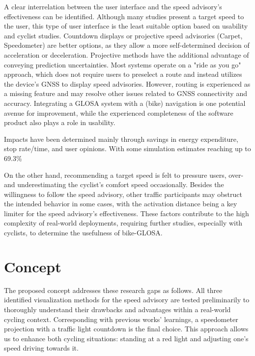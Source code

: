 \begin{Summary}
A clear interrelation between the user interface and the speed advisory's effectiveness can be identified. Although many studies present a target speed to the user, this type of user interface is the least suitable option based on usability and cyclist studies. Countdown displays or projective speed advisories (Carpet, Speedometer) are better options, as they allow a more self-determined decision of acceleration or deceleration. Projective methods have the additional advantage of conveying prediction uncertainties. Most systems operate on a "ride as you go" approach, which does not require users to preselect a route and instead utilizes the device's GNSS to display speed advisories. However, routing is experienced as a missing feature and may resolve other issues related to GNSS connectivity and accuracy. Integrating a GLOSA system with a (bike) navigation is one potential avenue for improvement, while the experienced completeness of the software product also plays a role in usability.

Impacts have been determined mainly through savings in energy expenditure, stop rate/time, and user opinions. With some simulation estimates reaching up to 69.3\% %

On the other hand, recommending a target speed is felt to pressure users, over- and underestimating the cyclist's comfort speed occasionally. Besides the willingness to follow the speed advisory, other traffic participants may obstruct the intended behavior in some cases, with the activation distance being a key limiter for the speed advisory's effectiveness. These factors contribute to the high complexity of real-world deployments, requiring further studies, especially with cyclists, to determine the usefulness of bike-GLOSA.
\end{Summary}

\section{Concept}

The proposed concept addresses these research gaps as follows. All three identified visualization methods for the speed advisory are tested preliminarily to thoroughly understand their drawbacks and advantages within a real-world cycling context. Corresponding with previous works' learnings, a speedometer projection with a traffic light countdown is the final choice. This approach allows us to enhance both cycling situations: standing at a red light and adjusting one's speed driving towards it.

